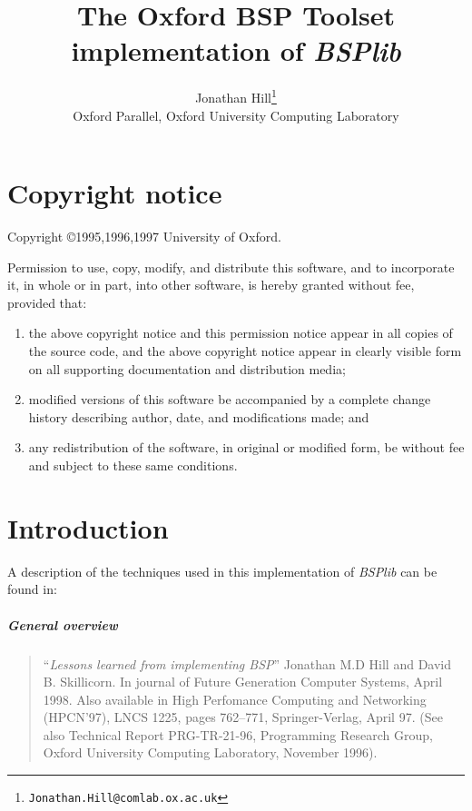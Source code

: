 \documentclass[12pt]{report}
\newcommand{\bsplib}{\textsl{BSPlib}}
\begin{document}
\title{The Oxford BSP Toolset implementation of \bsplib{}}
\author{Jonathan Hill\footnote{\texttt{Jonathan.Hill@comlab.ox.ac.uk}}\\
        Oxford Parallel, Oxford University Computing Laboratory}
\maketitle

\tableofcontents

\chapter*{Copyright notice}
\centerline{Copyright \copyright 1995,1996,1997 University of Oxford.}
\vspace{2ex}

\noindent Permission to use, copy, modify, and distribute this
software, and to incorporate it, in whole or in part, into other
software, is hereby granted without fee, provided that:
\begin{enumerate}
\item the above copyright notice and this permission notice appear in
all copies of the source code, and the above copyright notice appear
in clearly visible form on all supporting documentation and
distribution media;

\item modified versions of this software be accompanied by a complete
change history describing author, date, and modifications made; and 

\item any redistribution of the software, in original or modified form, be without fee and subject to these same conditions.
\end{enumerate}

\chapter*{Introduction}
A description of the techniques used in this implementation of
\bsplib{} \cite{bsplib,bsplib:prop} can be found in:

\paragraph{General overview}
\begin{quote}
\cite{hill:lessons} ``\emph{Lessons learned from implementing BSP}''
     Jonathan M.D Hill and David B. Skillicorn. In journal of Future
     Generation Computer Systems, April 1998. Also available in High
     Perfomance Computing and Networking (HPCN'97), LNCS 1225, pages
     762--771, Springer-Verlag, April 97. (See also Technical Report
     PRG-TR-21-96, Programming Research Group, Oxford University
     Computing Laboratory, November 1996).  
\end{quote}
\end{document}
